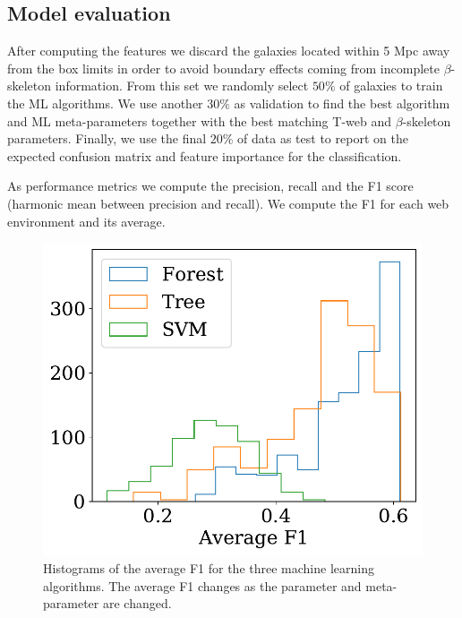 \documentclass[usenatbib]{mnras}
\begin{document}
\subsection{Model evaluation}

After computing the features we discard the galaxies located within 5 Mpc
away from the box limits  in order  to avoid boundary effects coming
from incomplete $\beta$-skeleton information.  
From this set we randomly select $50\%$ of galaxies to train the ML
algorithms.   
We use another $30\%$ as validation to find the best algorithm and ML
meta-parameters together with the best matching T-web and
$\beta$-skeleton parameters.   
Finally, we use the final $20 \%$ of data as test to report
on the expected confusion matrix and feature importance for the
classification. 

As performance metrics we compute the precision, recall and the F1
score (harmonic mean between precision and recall).  
We compute the F1 for each web environment and its average.


\begin{figure}
    \includegraphics[scale=0.55]{Figs/p_hist_f1.pdf}
    \caption{Histograms of the average F1 for the three machine
      learning algorithms.
      The average F1 changes as the parameter and meta-parameter
      are changed.}
    \label{fig:methods}
\end{figure}
\end{document}

